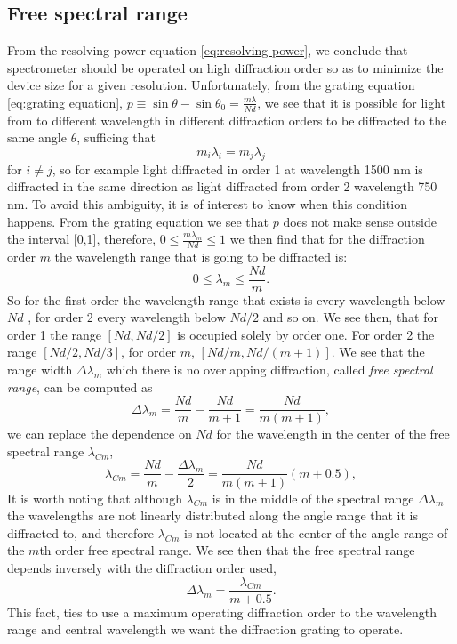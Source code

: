 \documentclass[12pt,twoside,english]{book}
\renewcommand{\~}{\perispomeni}%
\numberwithin{equation}{section}
\numberwithin{figure}{section}
\begin{document}
\subsection{Free spectral range}

From the resolving power equation \ref{eq:resolving power}, we conclude that spectrometer should be operated on high diffraction order so as to minimize the device size for a given resolution. Unfortunately, from the grating equation \ref{eq:grating equation}, $p\equiv\sin\theta-\sin\theta_{0}=\frac{m\lambda}{Nd}$, we see that it is possible for light from to different wavelength in different diffraction orders to be diffracted to the same angle $\theta$, sufficing that 
\begin{equation}
m_{i}\lambda_{i}=m_{j}\lambda_{j}
\end{equation}
for $i\neq j$, so for example light diffracted in order 1 at wavelength 1500 nm is diffracted in the same direction as light diffracted from order 2 wavelength 750 nm. To avoid this ambiguity, it is of interest to know when this condition happens. From the grating equation we see that $p$ does not make sense outside the interval {[}0,1{]}, therefore, $0\le\frac{m\lambda_{m}}{Nd}\le1$ we then find that for the diffraction order $m$ the wavelength range that is going to be diffracted is:
\begin{equation}
0\le\lambda_{m}\le\frac{Nd}{m}.
\end{equation}
So for the first order the wavelength range that exists is every wavelength below $Nd$ , for order 2 every wavelength below $Nd/2$ and so on. We see then, that for order 1 the range $[Nd,Nd/2]$ is occupied solely by order one. For order 2 the range $[Nd/2,Nd/3]$, for order $m$, $[Nd/m,Nd/(m+1)]$. We see that the range width $\Delta\lambda_{m}$
which there is no overlapping diffraction, called \emph{free spectral range}, can be computed as
\begin{equation} 
\Delta\lambda_{m}=\frac{Nd}{m}-\frac{Nd}{m+1}=\frac{Nd}{m(m+1)},
\end{equation}
we can replace the dependence on $Nd$ for the wavelength in the center of the free spectral range $\lambda_{Cm}$,
\begin{equation}
\lambda_{Cm}=\frac{Nd}{m}-\frac{\Delta\lambda_{m}}{2}=\frac{Nd}{m(m+1)}(m+0.5),
\end{equation}
It is worth noting that although $\lambda_{Cm}$ is in the middle of the spectral range $\Delta\lambda_{m}$ the wavelengths are not linearly distributed along the angle range that it is diffracted to, and therefore $\lambda_{Cm}$ is not located at the center of the angle range of the $m$th order free spectral range. We see then that the free spectral range depends inversely with the diffraction order used,
\begin{equation}
\Delta\lambda_{m}=\frac{\lambda_{Cm}}{m+0.5}.
\label{eq:FSR}
\end{equation}
This fact, ties to use a maximum operating diffraction order to the wavelength range and central wavelength we want the diffraction grating to operate.
\end{document}
